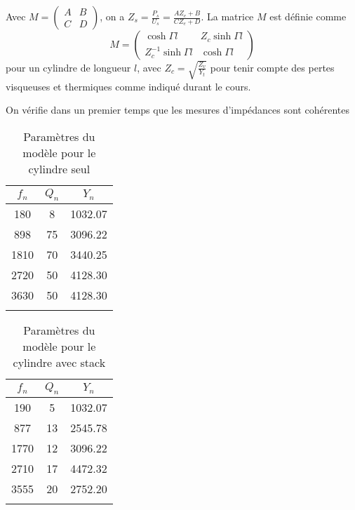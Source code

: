 \documentclass[atiam, article]{rapport} %
\begin{document}
Avec $M = \begin{pmatrix}A & B\\C&D\end{pmatrix}$, on a $Z_s = \frac{P_s}{U_s} = \frac{A Z_e + B}{C Z_e + D}$. La matrice $M$ est définie comme
\begin{equation}
    M = \begin{pmatrix}
        \cosh \Gamma l & Z_c \sinh \Gamma l \\
        Z_c^{-1} \sinh \Gamma l & \cosh \Gamma l
    \end{pmatrix}
    \label{eq:mat_trans_cylindre}
\end{equation}
pour un cylindre de longueur $l$, avec $Z_c = \sqrt{\frac{Z_v}{Y_t}}$ pour tenir compte des pertes visqueuses et thermiques comme indiqué durant le cours\cite{Vergez4}.


On vérifie dans un premier temps que les mesures d'impédances sont cohérentes 

\begin{table}[]
    \centering
    \begin{tabular}{ccc}
\toprule
$f_n$ & $Q_n$ & $Y_n$ \\ \midrule
180 & 8 & 1032.07 \\
898 & 75 & 3096.22 \\
1810 & 70 & 3440.25 \\
2720 & 50 & 4128.30 \\
3630 & 50 & 4128.30 \\
\bottomrule\\
    \end{tabular}
    \caption{Paramètres du modèle pour le cylindre seul}
    \label{tab:param_cylindre}
\end{table}

\begin{table}[]
    \centering
    \begin{tabular}{ccc}
\toprule
$f_n$ & $Q_n$ & $Y_n$ \\ \midrule
190 & 5 & 1032.07 \\
877 & 13 & 2545.78 \\
1770 & 12 & 3096.22 \\
2710 & 17 & 4472.32 \\
3555 & 20 & 2752.20 \\
\bottomrule\\
    \end{tabular}
    \caption{Paramètres du modèle pour le cylindre avec stack}
    \label{tab:param_cylindre+stack}
\end{table}
\end{document}

